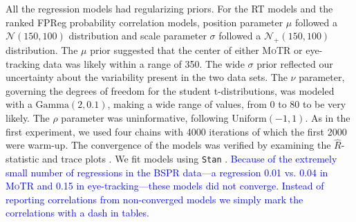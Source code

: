 \documentclass[12pt]{article}
\newcommand{\motr}{\textsc{MoTR}\xspace}
\newcommand{\change}[1]{\textcolor{blue}{#1}}
\begin{document}
{%

All the regression models had regularizing priors. For the RT models and the ranked FPReg probability correlation models, position parameter \(\mu\) followed a \(\mathcal{N}(150, 100)\) distribution and scale parameter \(\sigma\) followed a \(\mathcal{N}_{+}(150, 100)\) distribution.  The \(\mu\) prior suggested that the center of either \motr or eye-tracking data was likely within a range of 350. The wide \(\sigma\) prior reflected our uncertainty about the variability present in the two data sets. The \(\nu\) parameter, governing the degrees of freedom for the student t-distributions, was modeled with a \(\text{Gamma}(2, 0.1)\), making a wide range of values, from 0 to 80 to be very likely.
The \(\rho\) parameter was uninformative, following \( \text{Uniform}(-1, 1)\). As in the first experiment, we used four chains with 4000 iterations of which the first 2000 were warm-up. The convergence of the models was verified by examining the \(\hat{R}\)-statistic and trace plots \citep{gelman1995bayesian}. We fit models using \texttt{Stan} \citep{carpenter2017stan}. \change{Because of the extremely small number of regressions in the BSPR data---a regression 0.01 vs. 0.04 in \motr and 0.15 in eye-tracking---these models did not converge. Instead of reporting correlations from non-converged models we simply mark the correlations with a dash in tables.}

}
\end{document}
